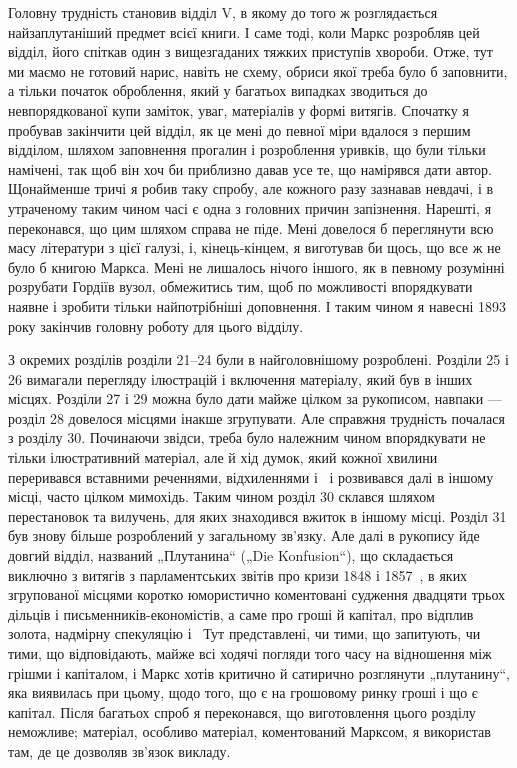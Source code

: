 
Головну трудність становив відділ V, в якому до того ж
розглядається найзаплутаніший предмет всієї книги. І саме тоді,
коли Маркс розробляв цей відділ, його спіткав один з вищезгаданих
тяжких приступів хвороби. Отже, тут ми маємо не готовий
нарис, навіть не схему, обриси якої треба було б заповнити,
а тільки початок оброблення, який у багатьох випадках зводиться
до невпорядкованої купи заміток, уваг, матеріалів у формі
витягів. Спочатку я пробував закінчити цей відділ, як це мені
до певної міри вдалося з першим відділом, шляхом заповнення
прогалин і розроблення уривків, що були тільки намічені, так щоб
він хоч би приблизно давав усе те, що намірявся дати автор. Щонайменше
тричі я робив таку спробу, але кожного разу зазнавав
невдачі, і в утраченому таким чином часі є одна з головних причин
запізнення. Нарешті, я переконався, що цим шляхом справа
не піде. Мені довелося б переглянути всю масу літератури з цієї
галузі, і, кінець-кінцем, я виготував би щось, що все ж не було б
книгою Маркса. Мені не лишалось нічого іншого, як в певному
розумінні розрубати Гордіїв вузол, обмежитись тим, щоб по
можливості впорядкувати наявне і зробити тільки найпотрібніші
доповнення. І таким чином я навесні 1893 року закінчив головну
роботу для цього відділу.

З окремих розділів розділи 21--24 були в найголовнішому
розроблені. Розділи 25 і 26 вимагали перегляду ілюстрацій і
включення матеріалу, який був в інших місцях. Розділи 27 і 29 можна
було дати майже цілком за рукописом, навпаки — розділ 28 довелося
місцями інакше згрупувати. Але справжня трудність почалася
з розділу 30. Починаючи звідси, треба було належним чином
впорядкувати не тільки ілюстративний матеріал, але й хід думок,
який кожної хвилини переривався вставними реченнями, відхиленнями
і~ і розвивався далі в іншому місці, часто цілком мимохідь.
Таким чином розділ 30 склався шляхом перестановок та вилучень,
для яких знаходився вжиток в іншому місці. Розділ 31 був знову
більше розроблений у загальному зв’язку. Але далі в рукопису
йде довгий відділ, названий „Плутанина“ („Die Konfusion“), що
складається виключно з витягів з парламентських звітів про кризи
1848 і 1857~, в яких згрупованої місцями коротко юмористично
коментовані судження двадцяти трьох дільців і письменників-економістів,
а саме про гроші й капітал, про відплив золота, надмірну
спекуляцію і~ Тут представлені, чи тими, що запитують,
чи тими, що відповідають, майже всі ходячі погляди того
часу на відношення між грішми і капіталом, і Маркс хотів критично
й сатирично розглянути „плутанину“, яка виявилась при цьому,
щодо того, що є на грошовому ринку гроші і що є капітал.
Після багатьох спроб я переконався, що виготовлення цього
розділу неможливе; матеріал, особливо матеріал, коментований
Марксом, я використав там, де це дозволяв зв’язок викладу.

